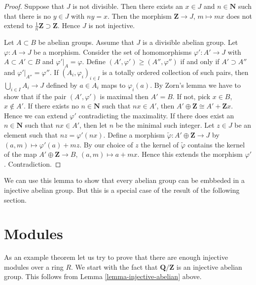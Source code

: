 \begin{proof}
Suppose that $J$ is not divisible. Then there exists
an $x \in J$ and $n \in \mathbf{N}$ such that there
is no $y \in J$ with $n y = x$. Then the morphism
$\mathbf{Z} \to J$, $m \mapsto mx$ does not extend
to $\frac{1}{n}\mathbf{Z} \supset \mathbf{Z}$. Hence
$J$ is not injective.

\medskip\noindent
Let $A \subset B$ be abelian groups.
Assume that $J$ is a divisible abelian group.
Let $\varphi : A \to J$ be a morphism. 
Consider the set of homomorphisms $\varphi' : A' \to J$
with $A \subset A' \subset B$ and $\varphi'|_A = \varphi$.
Define $(A', \varphi') \geq (A'', \varphi'')$ if
and only if $A' \supset A''$ and $\varphi'|_{A''} = \varphi''$.
If $(A_i, \varphi_i)_{i \in I}$ is a totally
ordered collection of such pairs, then
$\bigcup_{i \in I} A_i \to J$ defined by $a \in A_i$
maps to $\varphi_i(a)$. By Zorn's lemma we have to show
that if the pair $(A', \varphi')$ is maximal then
$A' = B$. If not, pick $x \in B$, $x \not \in A'$.
If there exists no $n\in \mathbf{N}$ such that
$nx \in A'$, then $A' \oplus \mathbf{Z} \cong A' + \mathbf{Z}x$.
Hence we can extend $\varphi'$ contradicting the maximality.
If there does exist an $n \in \mathbf{N}$ such that
$nx \in A'$, then let $n$ be the minimal such integer.
Let $z \in J$ be an element such that $nz = \varphi'(nx)$.
Define a morphism $\tilde \varphi : A' \oplus \mathbf{Z} \to J$ by
$(a, m) \mapsto \varphi'(a) + mz$. By our choice of
$z$ the kernel of $\tilde \varphi$ contains the kernel
of the map $A' \oplus \mathbf{Z} \to B$,
$(a, m) \mapsto a + mx$. Hence this extends the morphism
$\varphi'$. Contradiction.
\end{proof}

\noindent
We can use this lemma to show that every abelian
group can be embbeded in a injective abelian
group. But this is a special case of the result of
the following section.

\section{Modules}
\label{section-injectives-modules}

\noindent 
As an example theorem let us try to prove that there are enough injective
modules over a ring $R$. We start with the fact that $\mathbf{Q}/\mathbf{Z}$ 
is an injective abelian group. This follows from
Lemma \ref{lemma-injective-abelian} above.

